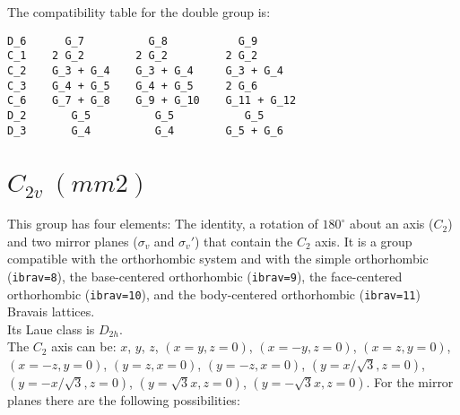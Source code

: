 \documentclass[12pt,a4paper,twoside]{report}
\begin{document}
The compatibility table for the double group is:

\begin{tcolorbox}
\begin{footnotesize}
\begin{verbatim}
D_6      G_7          G_8           G_9 
C_1    2 G_2        2 G_2         2 G_2
C_2    G_3 + G_4    G_3 + G_4     G_3 + G_4
C_3    G_4 + G_5    G_4 + G_5     2 G_6
C_6    G_7 + G_8    G_9 + G_10    G_11 + G_12
D_2       G_5          G_5           G_5
D_3       G_4          G_4        G_5 + G_6
\end{verbatim}
\end{footnotesize}
\end{tcolorbox}

\newpage
{\color{coral}\section{$C_{2v}\ (mm2)$}}
\color{black}
This group has four elements: The identity, a rotation of $180^\circ$ about
an axis ($C_2$) and two mirror planes ($\sigma_v$ and $\sigma_v'$) that contain 
the $C_2$ axis.
It is a group compatible with the orthorhombic system and with the
simple orthorhombic (\texttt{ibrav=8}), the base-centered
orthorhombic (\texttt{ibrav=9}), the face-centered orthorhombic 
(\texttt{ibrav=10}), and the body-centered orthorhombic (\texttt{ibrav=11}) 
Bravais lattices.\\
Its Laue class is $D_{2h}$. \\
The $C_2$ axis can be:
$x$, $y$, $z$, $(x=y, z=0)$, $(x=-y, z=0)$, $(x=z, y=0)$, $(x=-z, y=0)$,
$(y=z, x=0)$, $(y=-z, x=0)$, $(y=x/\sqrt{3}, z=0)$, $(y=-x/\sqrt{3}, z=0)$, 
$(y=\sqrt{3}x, z=0)$, $(y=-\sqrt{3}x, z=0)$. For the mirror planes there are
the following possibilities:
\end{document}
